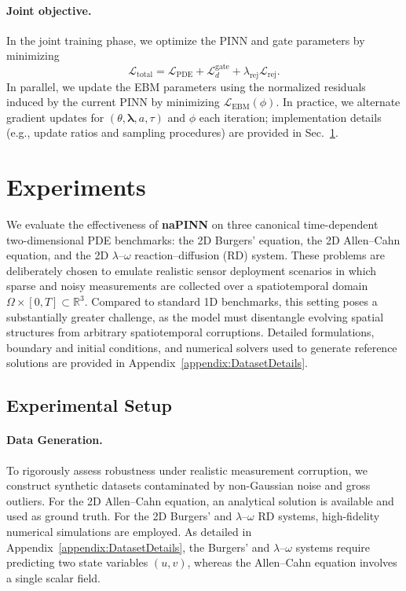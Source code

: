 \documentclass{article}
\theoremstyle{plain}
\theoremstyle{definition}
\theoremstyle{remark}
\begin{document}
\paragraph{Joint objective.}
In the joint training phase, we optimize the PINN and gate parameters by minimizing
\begin{equation}
\mathcal{L}_{\text{total}}
= \mathcal{L}_{\text{PDE}}
+ \mathcal{L}_{d}^{\text{gate}}
+ \lambda_{\text{rej}}\mathcal{L}_{\text{rej}}.
\label{eq:joint_pinn_gate}
\end{equation}
In parallel, we update the EBM parameters using the normalized residuals induced by the current PINN by minimizing $\mathcal{L}_{\text{EBM}}(\phi)$.
In practice, we alternate gradient updates for $(\theta,\boldsymbol{\lambda},a,\tau)$ and $\phi$ each iteration; implementation details (e.g., update ratios and sampling procedures) are provided in Sec.~\ref{sec:experiments}.

\section{Experiments}
\label{sec:experiments}

We evaluate the effectiveness of \textbf{naPINN} on three canonical time-dependent two-dimensional PDE benchmarks: the 2D Burgers' equation, the 2D Allen--Cahn equation, and the 2D $\lambda$--$\omega$ reaction--diffusion (RD) system. These problems are deliberately chosen to emulate realistic sensor deployment scenarios in which sparse and noisy measurements are collected over a spatiotemporal domain $\Omega \times [0, T] \subset \mathbb{R}^3$. Compared to standard 1D benchmarks, this setting poses a substantially greater challenge, as the model must disentangle evolving spatial structures from arbitrary spatiotemporal corruptions. Detailed formulations, boundary and initial conditions, and numerical solvers used to generate reference solutions are provided in Appendix~\ref{appendix:DatasetDetails}.

\subsection{Experimental Setup}

\paragraph{Data Generation.} To rigorously assess robustness under realistic measurement corruption, we construct synthetic datasets contaminated by non-Gaussian noise and gross outliers. For the 2D Allen--Cahn equation, an analytical solution is available and used as ground truth. For the 2D Burgers' and $\lambda$--$\omega$ RD systems, high-fidelity numerical simulations are employed. As detailed in Appendix~\ref{appendix:DatasetDetails}, the Burgers' and $\lambda$--$\omega$ systems require predicting two state variables $(u, v)$, whereas the Allen--Cahn equation involves a single scalar field.
\end{document}
